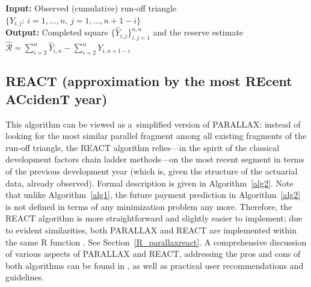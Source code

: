 \begin{algorithm}[!htb]%
\caption{PARALLAX}\label{alg1}

{\bf Input: } Observed (cumulative) run-off triangle $\{Y_{i, j}:\,i = 1, \dots, n,\,j = 1, \dots, n+ 1-i\}$\\%
\Begin{
$\bullet$ Set the observed as the predicted, $\widehat{Y}_{i, j} = Y_{i,j}$ for  $i = 1, \dots, n$ and $j = 1,\dots, n+1-i$\\

\For{$i = 2, \dots, n$}{

\For{$j = n+1-i, \dots, n-1$}{%

	$\bullet$ {Find the most similar development profile %
	\begin{equation}\label{eq2}
		{\widehat{\ell}_{i,j} = \arg\min_{\ell \in \{1, \dots, n - j\}} \left| \widehat{Y}_{i, j} - Y_{\ell, j} \right|}
	\end{equation}}

	$\bullet$ Predict the unobserved (future) value $Y_{i,j+1}$ such that $$\widehat{Y}_{i, j+1} = \widehat{Y}_{i, j} + \big( Y_{\widehat{\ell}_{i,j}, j+1} - Y_{\widehat{\ell}_{i,j} ,j} \big)$$
}   
}

}
{\bf Output: } Completed square $\{\widehat{Y}_{i, j}\}_{i,j = 1}^{n,n}$ and the reserve estimate $\widehat{\mathcal{R}} = \sum_{i = 2}^n \widehat{Y}_{i,n} - \sum_{i = 2}^n Y_{i, n + 1 - i}$ 
\end{algorithm}

\subsection{REACT {\rm (approximation by the most \textbf{RE}cent \textbf{AC}ciden\textbf{T} year)}}
\label{theory_react}
This algorithm  can be viewed as a~simplified version of PARALLAX: instead of looking for the most similar parallel fragment among all existing fragments of the run-off triangle, the REACT algorithm relies---in the spirit of the classical development factors chain ladder methods---on the most recent segment in terms of the previous development year (which is, given the structure of the actuarial data, already observed). Formal description is given in Algorithm~\ref{alg2}. Note that unlike Algorithm~\ref{alg1}, the future payment prediction in Algorithm~\ref{alg2} %
is not defined in terms of any minimization problem any more. Therefore, the REACT algorithm is more straightforward and slightly easier to implement; due to evident similarities, both PARALLAX and REACT are implemented within the same R function . See Section~\ref{R_parallaxreact}. A comprehensive discussion of various aspects of PARALLAX and REACT, addressing the pros and cons of both algorithms can be found in \cite{MMP2022}, as well as practical user recommendations and guidelines. 


